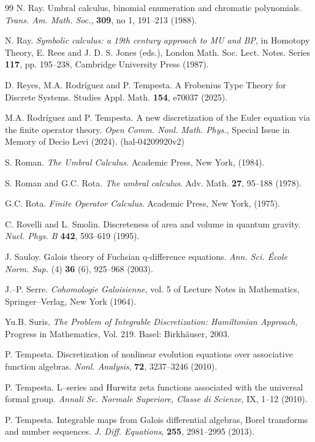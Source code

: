 \documentclass[10pt]{amsart}
\numberwithin{equation}{section}
\theoremstyle{definition}
\begin{document}
\begin{thebibliography}{99}
 N. Ray. Umbral calculus, binomial enumeration and chromatic polynomials. \textit{Trans. Am. Math. Soc.}, \textbf{309}, no 1, 191--213 (1988).

 N. Ray. \textit{Symbolic calculus: a 19th century approach to MU and BP}, in Homotopy Theory, E. Rees and J. D. S. Jones (eds.), London Math. Soc. Lect. Notes. Series \textbf{117}, pp. 195--238, Cambridge University Press (1987).

 D. Reyes, M.A. Rodr\'iguez and P. Tempesta. A Frobenius Type Theory for Discrete Systems. {Studies Appl. Math.} \textbf{154}, e70037 (2025).

 M.A. Rodr\'iguez and P. Tempesta. A new discretization of the Euler equation via the finite operator theory. \textit{Open Comm. Nonl. Math. Phys.}, Special Issue in Memory of Decio Levi (2024). (hal-04209920v2)


 S. Roman. \textit{The Umbral Calculus}. Academic Press, New York, (1984).

 S. Roman and G.C. Rota. \textit{The umbral calculus}. Adv. Math. \textbf{27}, 95--188 (1978).

 G.C. Rota. \textit{Finite Operator Calculus}. Academic Press, New York, (1975).

 C. Rovelli and L. Smolin. Discreteness of area and volume in quantum gravity. \textit{Nucl. Phys. B} \textbf{442}, 593--619 (1995).

 J. Sauloy. Galois theory of Fuchsian q-difference equations. \textit{Ann. Sci. \'Ecole Norm. Sup.} (4) \textbf{36} (6), 925--968 (2003).

 J.--P. Serre. \textit{Cohomologie Galoisienne}, vol. 5 of Lecture Notes in Mathematics, Springer--Verlag, New York (1964).

 Yu.B. Suris, \textit{The Problem of Integrable Discretization: Hamiltonian Approach}, Progress in Mathematics, Vol. 219. Basel: Birkh\"auser, 2003.
 
  P. Tempesta. Discretization of nonlinear evolution equations over associative function algebras. \textit{Nonl. Analysis}, \textbf{72}, 3237--3246 (2010).

  P. Tempesta.  L--series and Hurwitz zeta functions associated with the universal formal group. \textit{Annali Sc. Normale Superiore, Classe di Scienze}, IX, 1--12 (2010).

 P. Tempesta. Integrable maps from Galois differential algebras, Borel transforms and number sequences. \textit{J. Diff. Equations}, \textbf{255}, 2981--2995 (2013).


\end{thebibliography}
\end{document}

